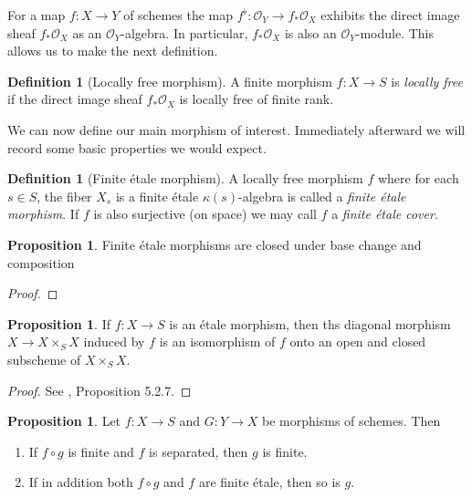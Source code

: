 \documentclass{article}
\theoremstyle{definition}
\newtheorem{proposition}[theorem]{Proposition}
\newtheorem{definition}[theorem]{Definition}
\theoremstyle{remark}
\newcommand{\mc}[1]{\mathcal{#1}}
\begin{document}
For a map $f: X \to Y$ of schemes the map $f^{\flat}: \mc{O}_Y \to f_*\mc{O}_X$ exhibits the direct image sheaf $f_* \mc{O}_X$ as an $\mc{O}_Y$-algebra.
In particular, $f_* \mc{O}_X$ is also an $\mc{O}_Y$-module.
This allows us to make the next definition.

\begin{definition}[Locally free morphism]	
	A finite morphism $f: X \to S$ is \textit{locally free} if the direct image sheaf $f_* \mc{O}_X$ is locally free of finite rank.   
\end{definition}

We can now define our main morphism of interest.
Immediately afterward we will record some basic properties we would expect.
\begin{definition}[Finite \'etale morphism]
	A locally free morphism $f$ where for each $s \in S$, the fiber $X_s$ is a finite \'etale $\kappa(s)$-algebra is called a \textit{finite \'etale morphism}.
	If $f$ is also surjective (on space) we may call $f$ a \textit{finite \'etale cover}.
\end{definition}


\begin{proposition}
Finite \'etale morphisms are closed under base change and composition
\end{proposition}

\begin{proof}
\end{proof}

\begin{proposition}
	If $f: X \to S$ is an \'etale morphism, then ths diagonal morphism $X \to X \times_S X$ induced by $f$ is an isomorphism of $f$ onto an open and closed subscheme of $X \times_S X$.
\end{proposition}

\begin{proof}
	See \cite{Szamuely}, Proposition 5.2.7.
\end{proof}

\begin{proposition}
	Let $f\colon X \to S$ and $G: Y \to X$ be morphisms of schemes. 
	Then 
	\begin{enumerate}
		\item If $f \circ g$ is finite and $f$ is separated, then $g$ is finite.
		\item If in addition both $f \circ g$ and $f$ are finite \'etale, then so is $g$.
	\end{enumerate}
	
\end{proposition}
\end{document}
